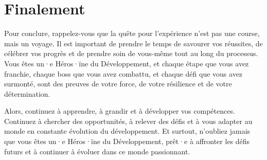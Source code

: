 \section*{Finalement}

Pour conclure, rappelez-vous que la quête pour l'expérience n'est pas une course, mais un voyage. Il est important de prendre le temps de savourer vos réussites, de célébrer vos progrès et de prendre soin de vous-même tout au long du processus. Vous êtes un·e Héros·ïne du Développement, et chaque étape que vous avez franchie, chaque boss que vous avez combattu, et chaque défi que vous avez surmonté, sont des preuves de votre force, de votre résilience et de votre détermination.

Alors, continuez à apprendre, à grandir et à développer vos compétences. Continuez à chercher des opportunités, à relever des défis et à vous adapter au monde en constante évolution du développement. Et surtout, n'oubliez jamais que vous êtes un·e Héros·ïne du Développement, prêt·e à affronter les défis futurs et à continuer à évoluer dans ce monde passionnant.

